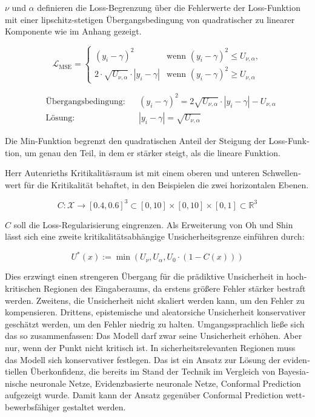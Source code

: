 \begin{otherlanguage}{ngerman}
$\nu$ und $\alpha$ definieren die Loss-Begrenzung über die Fehlerwerte der Loss-Funktion mit einer lipschitz-stetigen Übergangsbedingung von quadratischer zu linearer Komponente wie im Anhang gezeigt. 



\begin{equation}
\mathcal{L}_{\mathrm{MSE}} = 
\begin{cases}
  (y_i - \gamma)^2 & \text{wenn } (y_i - \gamma)^2 \le U_{\nu,\alpha}, \\
  2 \cdot \sqrt{U_{\nu, \alpha}} \cdot | y_i - \gamma | & \text{wenn } (y_i - \gamma)^2 \geq U_{\nu,\alpha}
\end{cases}
\end{equation}

\noindent
\begin{minipage}{\linewidth}
\begin{align*}
&\text{Übergangsbedingung:} && (y_i - \gamma)^2 = 2 \sqrt{U_{\nu,\alpha}} \cdot |y_i - \gamma| - U_{\nu,\alpha} \\
&\text{Lösung:} && |y_i - \gamma| = \sqrt{U_{\nu,\alpha}}
\end{align*}
\vspace{0.125\baselineskip}
\noindent
\end{minipage}

Die Min-Funktion begrenzt den quadratischen Anteil der Steigung der Loss-Funktion, um genau den Teil, in dem er stärker steigt, als die lineare Funktion. 

Herr Autenrieths Kritikalitäsraum ist mit einem oberen und unteren Schwellenwert für die Kritikalität behaftet, in den Beispielen die zwei horizontalen Ebenen.

\[
C \colon \mathcal{X} \rightarrow [0.4, 0.6]^3 \subset [0,10] \times [0,10] \times [0,1] \subset \mathbb{R}^3
\]

$C$ soll die Loss-Regularisierung eingrenzen. Als Erweiterung von Oh und Shin lässt sich eine zweite kritikalitätsabhängige Unsicherheitsgrenze einführen durch:

\[
U^*(x) := \min \left( U_\nu, U_\alpha, U_0 \cdot (1 - C(x)) \right)
\]

Dies erzwingt einen strengeren Übergang für die prädiktive Unsicherheit in hochkritischen Regionen des Eingaberaums, da erstens größere Fehler stärker bestraft werden. Zweitens, die Unsicherheit nicht skaliert werden kann, um den Fehler zu kompensieren. Drittens, epistemische und aleatorsiche Unsicherheit konservativer geschätzt werden, um den Fehler niedrig zu halten. Umgangssprachlich ließe sich das so zusammenfassen: Das Modell darf zwar seine Unsicherheit erhöhen. Aber nur, wenn der Punkt nicht kritisch ist. In sicherheitsrelevanten Regionen muss das Modell sich konservativer festlegen. Das ist ein Ansatz zur Lösung der evidentiellen Überkonfidenz, die bereits im Stand der Technik im Vergleich von \gls{Bayesianische neuronale Netze}, \gls{Evidenzbasierte neuronale Netze}, \gls{Conformal Prediction} aufgezeigt wurde. Damit kann der Ansatz gegenüber \gls{Conformal Prediction} wettbewerbsfähiger gestaltet werden.


\end{otherlanguage}
